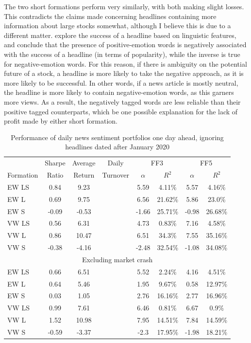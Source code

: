 The two short formations perform very similarly, with both making slight losses. This contradicts the claims made concerning headlines containing more information about large stocks somewhat, although I believe this is due to a different matter. \textcite{linguistic-effect-success} explore the success of a headline based on linguistic features, and conclude that the presence of positive-emotion words is negatively associated with the success of a headline (in terms of popularity), while the inverse is true for negative-emotion words. For this reason, if there is ambiguity on the potential future of a stock, a headline is more likely to take the negative approach, as it is more likely to be successful. In other words, if a news article is mostly neutral, the headline is more likely to contain negative-emotion words, as this garners more views. As a result, the negatively tagged words are less reliable than their positive tagged counterparts, which be one possible explanation for the lack of profit made by either short formation.

\begin{table}[!ht]
\begin{center}
\begin{tabular}{lccccccc}
      \toprule
      & Sharpe &  Average & Daily & \multicolumn{2}{c}{FF3} & \multicolumn{2}{c}{FF5} \\
      \cmidrule(lr){5-6}
      \cmidrule(lr){7-8}
      Formation & Ratio & Return & Turnover & $\alpha$ & $R^2$ & $\alpha$ & $R^2$ \\
      \midrule
      EW LS & 0.84  & 9.23 & & 5.59 & 4.11\% & 5.57 & 4.16\% \\
      EW L  & 0.69  & 9.75 & & 6.56 & 21.62\% & 5.86 & 23.0\% \\
      EW S  & -0.09 & -0.53 & & -1.66 & 25.71\% & -0.98 & 26.68\% \\
      VW LS & 0.56  & 6.31 & & 4.73 & 0.83\% & 7.16 & 4.58\% \\
      VW L  & 0.86  & 10.47 & & 6.51 & 34.3\% & 7.55 & 35.16\% \\
      VW S  & -0.38 & -4.16 & & -2.48 & 32.54\% & -1.08 & 34.08\% \\
      \midrule
      \multicolumn{8}{c}{Excluding market crash} \\
      \midrule
      EW LS & 0.66  & 6.51 & & 5.52 & 2.24\% & 4.16 & 4.51\% \\
      EW L  & 0.64  & 5.46 & & 1.95 & 9.67\% & 0.58 & 12.97\% \\
      EW S  & 0.03  & 1.05 & & 2.76 & 16.16\% & 2.77 & 16.96\% \\
      VW LS & 0.99  & 7.61 & & 6.46 & 0.81\% & 6.67 & 0.9\% \\
      VW L  & 1.52  & 10.98 & & 7.95 & 14.51\% & 7.84 & 14.59\% \\
      VW S  & -0.59 & -3.37 & & -2.3 & 17.95\% & -1.98 & 18.21\% \\
      \bottomrule
\end{tabular}
\caption{Performance of daily news sentiment portfolios one day ahead, ignoring headlines dated after January 2020}
\label{tab:portfolio-performance-no-covid}
\end{center}
\end{table}

